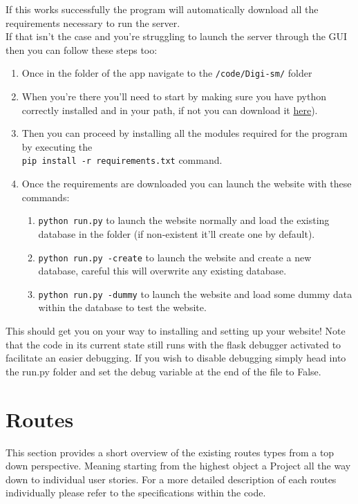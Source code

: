 \documentclass{article}
\begin{document}
\noindent If this works successfully the program will automatically download all the requirements necessary to run the server.
\\
If that isn't the case and you're struggling to launch the server through the GUI then you can follow these steps too:

\begin{enumerate}
    \item Once in the folder of the app navigate to the \verb|/code/Digi-sm/| folder
    \item When you're there you'll need to start by making sure you have python correctly installed and in your path, if not you can download it \hyperlink{https://www.python.org/downloads/}{here}).
    \item Then you can proceed by installing all the modules required for the program by executing the \\ \verb|pip install -r requirements.txt| command.
    \item Once the requirements are downloaded you can launch the website with these commands:
    \begin{enumerate}
        \item \verb|python run.py| to launch the website normally and load the existing database in the folder (if non-existent it'll create one by default).
        \item \verb|python run.py -create| to launch the website and create a new database, careful this will overwrite any existing database.
        \item \verb|python run.py -dummy| to launch the website and load some dummy data within the database to test the website.
    \end{enumerate}
\end{enumerate}

\noindent This should get you on your way to installing and setting up your website!
Note that the code in its current state still runs with the flask debugger activated to facilitate an easier debugging. If you wish to disable debugging simply head into the run.py folder and set the debug variable at the end of the file to False.

\section{Routes}
This section provides a short overview of the existing routes types from a top down perspective. Meaning starting from the highest object a Project all the way down to individual user stories.
For a more detailed description of each routes individually please refer to the specifications within the code.\\
\end{document}

